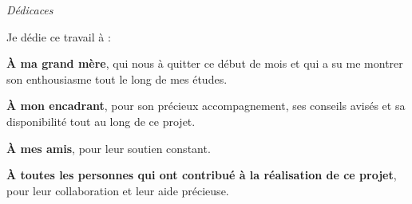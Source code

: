 \centering
\vspace*{\fill}
{\Huge\itshape Dédicaces\par}
\vspace{2cm}
Je dédie ce travail à :
    
\vspace{1cm}
\textbf{À ma grand mère}, qui nous à quitter ce début de mois et qui a su me montrer son enthousiasme tout le long de mes études.
    
\vspace{1cm}
\textbf{À mon encadrant}, pour son précieux accompagnement, ses conseils avisés et sa disponibilité tout au long de ce projet.
    
\vspace{1cm}
\textbf{À mes amis}, pour leur soutien constant.
    
\vspace{1cm}
\textbf{À toutes les personnes qui ont contribué à la réalisation de ce projet}, pour leur collaboration et leur aide précieuse.
    
\vspace*{\fill}
\clearpage
